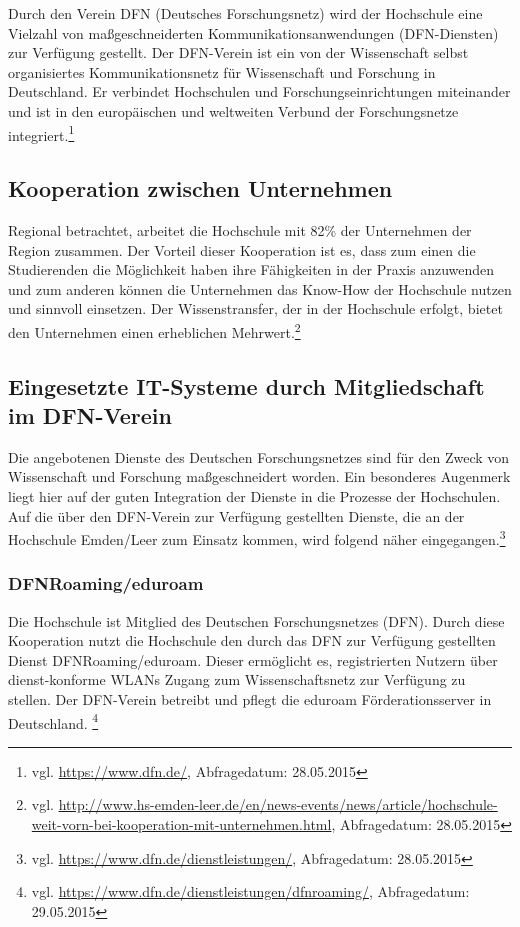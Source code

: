 Durch den Verein DFN (Deutsches Forschungsnetz) wird der Hochschule eine Vielzahl von maßgeschneiderten Kommunikationsanwendungen (DFN-Diensten) zur Verfügung gestellt. Der DFN-Verein ist ein von der Wissenschaft selbst organisiertes Kommunikationsnetz für Wissenschaft und Forschung in Deutschland. Er verbindet Hochschulen und Forschungseinrichtungen miteinander und ist in den europäischen und weltweiten  Verbund der Forschungsnetze integriert.\footnote{vgl. \url{https://www.dfn.de/}, Abfragedatum: 28.05.2015}

\subsection{Kooperation zwischen Unternehmen}
Regional betrachtet, arbeitet die Hochschule mit 82\% der Unternehmen der Region zusammen. Der Vorteil dieser Kooperation ist es, dass zum einen die Studierenden die Möglichkeit haben ihre Fähigkeiten in der Praxis anzuwenden und zum anderen können die Unternehmen das Know-How  der Hochschule nutzen und sinnvoll einsetzen. Der Wissenstransfer, der in der Hochschule erfolgt, bietet den Unternehmen einen erheblichen Mehrwert.\footnote{vgl. \url{http://www.hs-emden-leer.de/en/news-events/news/article/hochschule-weit-vorn-bei-kooperation-mit-unternehmen.html}, Abfragedatum: 28.05.2015}

\subsection{Eingesetzte IT-Systeme durch Mitgliedschaft im DFN-Verein}
Die angebotenen Dienste des Deutschen Forschungsnetzes sind für den Zweck von Wissenschaft und Forschung maßgeschneidert worden. Ein besonderes Augenmerk liegt hier auf der guten Integration der Dienste in die Prozesse der Hochschulen.  Auf die über den DFN-Verein zur Verfügung gestellten Dienste, die an der Hochschule Emden/Leer zum Einsatz kommen, wird folgend näher eingegangen.\footnote{vgl. \url{https://www.dfn.de/dienstleistungen/}, Abfragedatum: 28.05.2015}

\subsubsection{DFNRoaming/eduroam}
Die Hochschule ist Mitglied des Deutschen Forschungsnetzes (DFN). Durch diese Kooperation nutzt die Hochschule den durch das DFN zur Verfügung gestellten Dienst DFNRoaming/eduroam. Dieser ermöglicht es, registrierten Nutzern über dienst-konforme WLANs Zugang zum Wissenschaftsnetz zur Verfügung zu stellen. Der DFN-Verein betreibt und pflegt die eduroam Förderationsserver in Deutschland. \footnote{vgl. \url{https://www.dfn.de/dienstleistungen/dfnroaming/}, Abfragedatum: 29.05.2015} 

